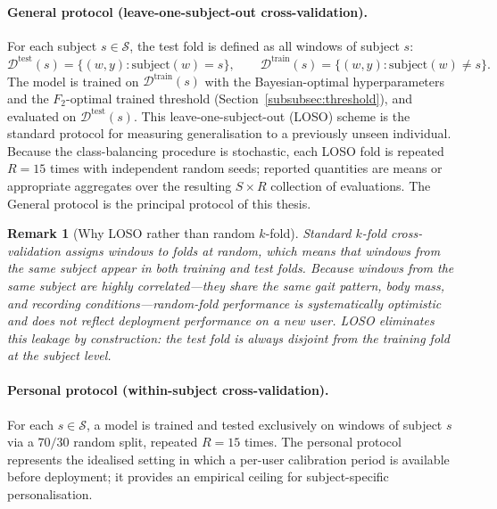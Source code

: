 \documentclass[onluarkali,ingilizce,yukseklisans,karton,LisansustuEgitim]{itutez}
\newtheorem{remark}{Remark}[chapter]
\providecommand{\1}{\mathbf{1}}
\providecommand{\Sset}{\mathcal{S}}
\begin{document}
\paragraph{General protocol (leave-one-subject-out cross-validation).}
For each subject $s\in\Sset$, the test fold is defined as all windows of subject $s$:
\[
  \mathcal{D}^{\mathrm{test}}(s) = \{(w,y):\mathrm{subject}(w)=s\},
  \qquad
  \mathcal{D}^{\mathrm{train}}(s) = \{(w,y):\mathrm{subject}(w)\neq s\}.
\]
The model is trained on $\mathcal{D}^{\mathrm{train}}(s)$ with the Bayesian-optimal hyperparameters and the $F_2$-optimal trained threshold (Section~\ref{subsubsec:threshold}), and evaluated on $\mathcal{D}^{\mathrm{test}}(s)$. This leave-one-subject-out (LOSO) scheme is the standard protocol for measuring generalisation to a previously unseen individual. Because the class-balancing procedure is stochastic, each LOSO fold is repeated $R=15$ times with independent random seeds; reported quantities are means or appropriate aggregates over the resulting $S\times R$ collection of evaluations. The General protocol is the principal protocol of this thesis.

\begin{remark}[Why LOSO rather than random $k$-fold]
\label{rem:loso-rationale}
Standard $k$-fold cross-validation assigns windows to folds at random, which means that windows from the same subject appear in both training and test folds. Because windows from the same subject are highly correlated---they share the same gait pattern, body mass, and recording conditions---random-fold performance is systematically optimistic and does not reflect deployment performance on a new user. LOSO eliminates this leakage by construction: the test fold is always disjoint from the training fold at the subject level.
\end{remark}

\paragraph{Personal protocol (within-subject cross-validation).}
For each $s\in\Sset$, a model is trained and tested exclusively on windows of subject $s$ via a $70/30$ random split, repeated $R=15$ times. The personal protocol represents the idealised setting in which a per-user calibration period is available before deployment; it provides an empirical ceiling for subject-specific personalisation.
\end{document}

